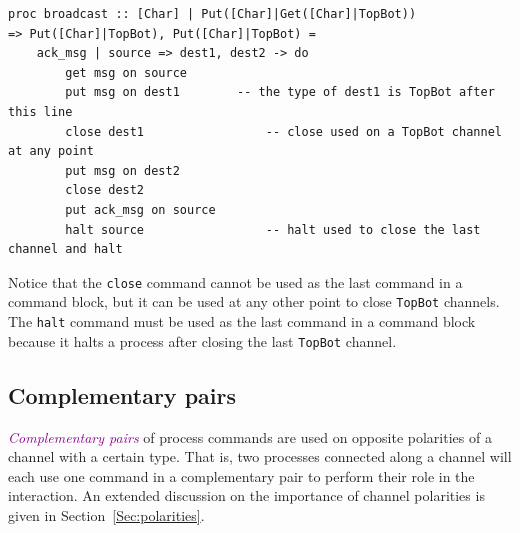 \documentclass[acmsmall]{acmart}
\newcommand{\tc}[1]{\textcolor{darkMagenta}{\textit{#1}}}
\begin{document}
\begin{lstlisting} 
proc broadcast :: [Char] | Put([Char]|Get([Char]|TopBot)) 										=> Put([Char]|TopBot), Put([Char]|TopBot) = 
	ack_msg | source => dest1, dest2 -> do
		get msg on source						
		put msg on dest1		-- the type of dest1 is TopBot after this line
		close dest1					-- close used on a TopBot channel at any point
		put msg on dest2
		close dest2    
		put ack_msg on source	
		halt source					-- halt used to close the last channel and halt
\end{lstlisting}
Notice that the \lstinline$close$ command cannot be used as the last command in a command block, but it can be used at any other point to close \lstinline$TopBot$ channels.
The \lstinline$halt$ command must be used as the last command in a command block because it halts a process after closing the last \lstinline$TopBot$ channel.
 
\subsection{Complementary pairs }
\label{subsec:pairs}

\tc{Complementary pairs} of process commands are used on opposite polarities of a channel with a certain type.
That is, two processes connected along a channel will each use one command in a complementary pair to perform their role in the interaction.
An extended discussion on the importance of channel polarities is given in Section~\ref{Sec:polarities}.
\end{document}
